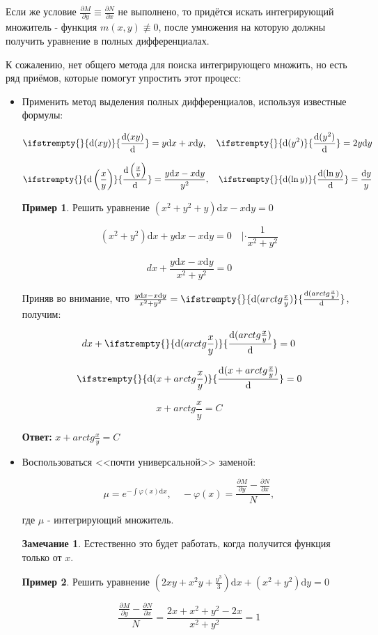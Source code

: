 \documentclass[a4paper, 14pt]{article}
\newcommand{\dx}{\mathrm{d}x}
\newcommand{\dy}{\mathrm{d}y}
\newcommand{\dv}[2]{%
  \ifstrempty{#2}%
    {\mathrm{d}#1}%
    {\frac{\mathrm{d}#1}{\mathrm{d}#2}}%
}
\newcommand{\pdv}[2]{\frac{\partial #1}{\partial #2}}
\renewcommand{\phi}{\varphi}
\theoremstyle{definition}
\newtheorem*{remark}{Замечание}
\newtheorem*{example}{Пример}
\newenvironment{answer}
  {\par\noindent\textbf{Ответ:}}
  {\par}
\begin{document}
Если же условие $\pdv{M}{y} \equiv \pdv{N}{x}$ не выполнено, то придётся искать интегрирующий множитель - функция $m(x, y) \not\equiv 0$, после умножения на которую должны получить уравнение в полных дифференциалах.

К сожалению, нет общего метода для поиска интегрирующего множить, но есть ряд приёмов, которые помогут упростить этот процесс:

\begin{itemize}
    \item\textbf{}Применить метод выделения полных дифференциалов, используя известные формулы:

    \[\dv{(xy)}{} = y\dx + x\dy, \quad \dv{(y^2)}{} = 2y\dy\]

    \[\dv{\left(\frac{x}{y}\right)}{} = \frac{y\dx-x\dy}{y^2}, \quad \dv{(\ln{y})}{} = \frac{\dy}{y}\]
    \begin{example}
    Решить уравнение $(x^2+y^2+y)\dx - x\dy = 0$

    \[(x^2+y^2)\dx + y\dx - x\dy = 0 \quad |\cdot \frac{1}{x^2+y^2}\]

    \[dx + \frac{y\dx - x\dy}{x^2+y^2} = 0\]

    Приняв во внимание, что $\frac{y\dx - x\dy}{x^2+y^2} = \dv{(arctg{\frac{x}{y}})}{}$, получим:

    \[dx+\dv{(arctg{\frac{x}{y}})}{} = 0\]

    \[\dv{(x+arctg{\frac{x}{y}})}{} = 0\]

    \[x+arctg{\frac{x}{y}} = C\]
    
    \end{example}
    \begin{answer}
    $x+arctg{\frac{x}{y}} = C$
    \end{answer}
    \item\textbf{}Воспользоваться <<почти универсальной>> заменой:

\[\mu = e^{-\int\phi(x)\dx}, \quad -\phi(x) = \frac{\pdv{M}{y} - \pdv{N}{x}}{N},\]

где $\mu$ - интегрирующий множитель.

\begin{remark}
    Естественно это будет работать, когда получится функция только от $x$.
\end{remark}
    \begin{example}
        Решить уравнение $(2xy+x^2y+\frac{y^3}{3})\dx +(x^2+y^2)\dy = 0 $

        \[\frac{\pdv{M}{y} - \pdv{N}{x}}{N} = \frac{2x+x^2+y^2-2x}{x^2+y^2} = 1\]


\end{example}
\end{itemize}
\end{document}
